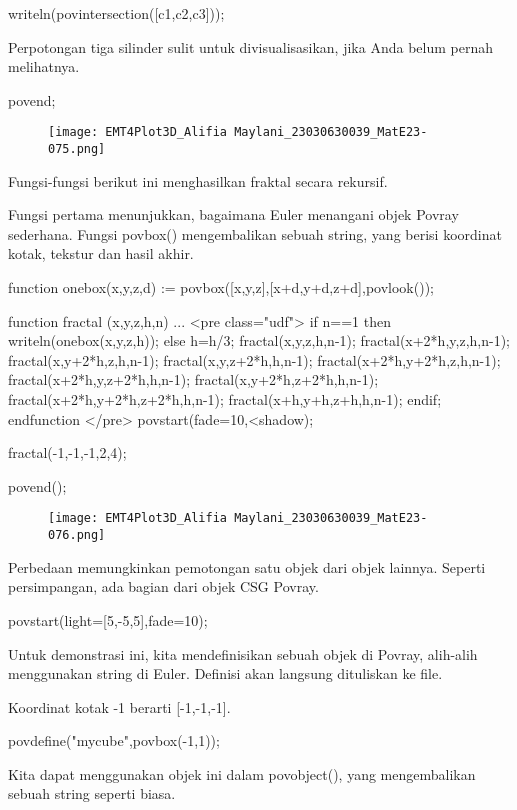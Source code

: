 \documentclass{article}
\begin{document}
\>writeln(povintersection([c1,c2,c3]));


Perpotongan tiga silinder sulit untuk divisualisasikan, jika Anda
belum pernah melihatnya.


\>povend;


\begin{figure}
    \centering
    \texttt{[image: EMT4Plot3D\_Alifia Maylani\_23030630039\_MatE23-075.png]}
    \caption{}
    \label{fig:enter-label}
\end{figure}

Fungsi-fungsi berikut ini menghasilkan fraktal secara rekursif.


Fungsi pertama menunjukkan, bagaimana Euler menangani objek Povray
sederhana. Fungsi povbox() mengembalikan sebuah string, yang berisi
koordinat kotak, tekstur dan hasil akhir.


\>function onebox(x,y,z,d) := povbox([x,y,z],[x+d,y+d,z+d],povlook());

\>function fractal (x,y,z,h,n) ...  
\>  
<pre class="udf">     if n==1 then writeln(onebox(x,y,z,h));
     else
       h=h/3;
       fractal(x,y,z,h,n-1);
       fractal(x+2*h,y,z,h,n-1);
       fractal(x,y+2*h,z,h,n-1);
       fractal(x,y,z+2*h,h,n-1);
       fractal(x+2*h,y+2*h,z,h,n-1);
       fractal(x+2*h,y,z+2*h,h,n-1);
       fractal(x,y+2*h,z+2*h,h,n-1);
       fractal(x+2*h,y+2*h,z+2*h,h,n-1);
       fractal(x+h,y+h,z+h,h,n-1);
     endif;
    endfunction
</pre>
\>povstart(fade=10,<shadow);

\>fractal(-1,-1,-1,2,4);

\>povend();


\begin{figure}
    \centering
    \texttt{[image: EMT4Plot3D\_Alifia Maylani\_23030630039\_MatE23-076.png]}
    \caption{}
    \label{fig:enter-label}
\end{figure}

Perbedaan memungkinkan pemotongan satu objek dari objek lainnya.
Seperti persimpangan, ada bagian dari objek CSG Povray.


\>povstart(light=[5,-5,5],fade=10);


Untuk demonstrasi ini, kita mendefinisikan sebuah objek di Povray,
alih-alih menggunakan string di Euler. Definisi akan langsung
dituliskan ke file.


Koordinat kotak -1 berarti [-1,-1,-1].


\>povdefine("mycube",povbox(-1,1));


Kita dapat menggunakan objek ini dalam povobject(), yang mengembalikan
sebuah string seperti biasa.
\end{document}
